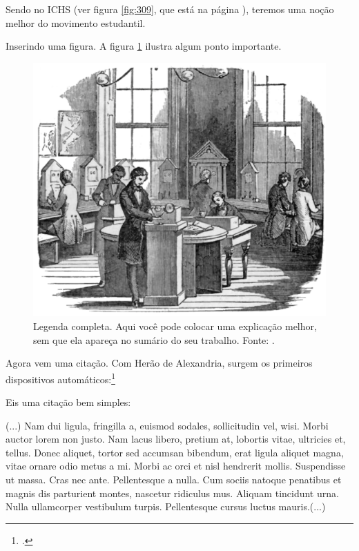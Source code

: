 \documentclass[
	12pt,				%
	openright,			%
	twoside,			%
	a4paper,			%
	english,			%
	brazil				%
	]{abntex2}
\begin{document}
Sendo no ICHS (ver figura \ref{fig:309}, que está na página \pageref{fig:309}), teremos uma noção melhor do movimento estudantil.

Inserindo uma figura. A figura \ref{fig:308} ilustra algum ponto importante.
\begin{figure}[htbp]
	\centering
	\includegraphics[scale=0.3]{fig09} %
	\caption[Legenda reduzida - aparece no sumario]{Legenda completa. Aqui você pode colocar uma explicação melhor, sem que ela apareça no sumário do seu trabalho. Fonte: \cite[p.~117]{boyle1772}.}
	\label{fig:308}
\end{figure}

Agora vem uma citação. Com Herão de Alexandria, surgem os primeiros dispositivos automáticos:\footcite{herao}

Eis uma citação bem simples:
\begin{citacao}
	(...) Nam dui ligula, fringilla a, euismod sodales, sollicitudin vel, wisi. Morbi auctor lorem non justo. Nam lacus libero, pretium at, lobortis vitae, ultricies et, tellus. Donec aliquet, tortor sed accumsan bibendum, erat ligula aliquet magna, vitae ornare odio metus a mi. Morbi ac orci et nisl hendrerit mollis. Suspendisse ut massa. Cras nec ante. Pellentesque a nulla. Cum sociis natoque penatibus et magnis dis parturient montes, nascetur ridiculus mus. Aliquam tincidunt urna. Nulla
	ullamcorper vestibulum turpis. Pellentesque cursus luctus mauris.(...)
\end{citacao}
\end{document}
